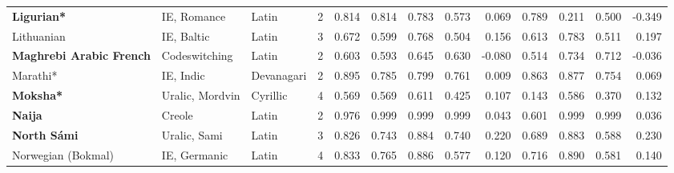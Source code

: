 \begin{tabular}{lllrrrrrrrrrr}
             \textbf{Ligurian*} &                     IE, Romance &      Latin &         2 &                       0.814 &                         0.814 &         0.783 &                  0.573 &            0.069 &                         0.789 &         0.211 &                  0.500 &           -0.349 \\
                     Lithuanian &                      IE, Baltic &      Latin &         3 &                       0.672 &                         0.599 &         0.768 &                  0.504 &            0.156 &                         0.613 &         0.783 &                  0.511 &            0.197 \\
\textbf{Maghrebi Arabic French} &                   Codeswitching &      Latin &         2 &                       0.603 &                         0.593 &         0.645 &                  0.630 &           -0.080 &                         0.514 &         0.734 &                  0.712 &           -0.036 \\
                       Marathi* &                       IE, Indic & Devanagari &         2 &                       0.895 &                         0.785 &         0.799 &                  0.761 &            0.009 &                         0.863 &         0.877 &                  0.754 &            0.069 \\
               \textbf{Moksha*} &                 Uralic, Mordvin &   Cyrillic &         4 &                       0.569 &                         0.569 &         0.611 &                  0.425 &            0.107 &                         0.143 &         0.586 &                  0.370 &            0.132 \\
                 \textbf{Naija} &                          Creole &      Latin &         2 &                       0.976 &                         0.999 &         0.999 &                  0.999 &            0.043 &                         0.601 &         0.999 &                  0.999 &            0.036 \\
            \textbf{North Sámi} &                    Uralic, Sami &      Latin &         3 &                       0.826 &                         0.743 &         0.884 &                  0.740 &            0.220 &                         0.689 &         0.883 &                  0.588 &            0.230 \\
             Norwegian (Bokmal) &                    IE, Germanic &      Latin &         4 &                       0.833 &                         0.765 &         0.886 &                  0.577 &            0.120 &                         0.716 &         0.890 &                  0.581 &            0.140 \\

\end{tabular}

